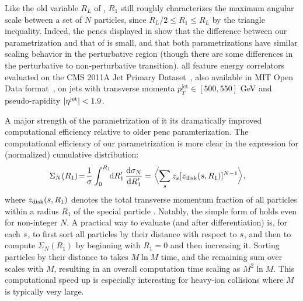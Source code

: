 \indent
Like the old variable \(R_L\) of , \(R_1\) still roughly characterizes the maximum angular scale between a set of \(N\) particles, since \(R_L/2 \leq R_1 \leq R_L\) by the triangle inequality.
%
Indeed, the \glspl{penc} displayed in  show that the difference between our parametrization and that of  is small, and that both parametrizations have similar scaling behavior in the perturbative region (though there are some differences in the perturbative to non-perturbative transition).
%
 all feature energy correlators evaluated on the CMS 2011A Jet Primary Dataset~\cite{CERNOpenDataPortal, CMS:JetPrimary2011A}, also available in MIT Open Data format~\cite{Komiske:2019jim, komiske_patrick_2019_3340205}, on jets with transverse momenta $p_{T}^{\text{jet}} \in [500, 550]$ GeV and pseudo-rapidity $\vert \eta^{\rm jet} \vert < 1.9$.

\indent
A major strength of the parametrization of  it its dramatically improved computational efficiency relative to older \gls{penc} paramterization.
%
The computational efficiency of our parametrization is more clear in the expression for (normalized) cumulative distribution:
\begin{align} \label{eq:new_cml}
  \Sigma_N(R_1)
  \!
  &=
  \!
  \frac{1}{\sigma}
  \int_0^{R_1}
  \!\!
  \dd R_1'
  \,
  \frac{\dd \sigma_N}{\dd R_1'}
  =
  \biggl\langle \sum_{\izero} z_{\izero} [z_{\rm disk}(\izero,R_1)]^{N-1}
  \biggr\rangle
  ,
\end{align}
where $z_{\rm disk}(\izero,R_1)$ denotes the total transverse momentum fraction of all particles within a radius $R_1$ of the special particle \izero{}.
%
Notably, the simple form of  holds even for non-integer $N$.
%
A practical way to evaluate  (and  after differentiation) is, for each $\izero$, to first sort all particles by their distance with respect to $\izero$, and then to compute $\Sigma_N(R_1)$ by beginning with $R_1=0$ and then increasing it.
%
Sorting particles by their distance to \izero{} takes $M\ln M$ time, and the remaining sum over \izero{} scales with $M$, resulting in an overall computation time scaling as $M^2 \ln M$.
%
This computational speed up is especially interesting for heavy-ion collisions where $M$ is typically very large.


